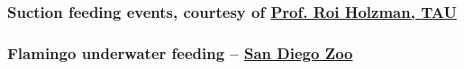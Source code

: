 \begin{frame}[label=app-22]
    \frametitle{Suction feeding events, courtesy of \href{https://www.dropbox.com/s/wcytdkxuxxvn4q0/fish_feeding.mp4?raw=1}{Prof. Roi Holzman, TAU}}
\end{frame}
    
\begin{frame}[label=app-23]
    \frametitle{Flamingo underwater feeding -- \href{https://www.dropbox.com/s/ic0l5npzon834l9/flamingo.mp4?raw=1}{San Diego Zoo}}
    \begin{center}
    \end{center}
\end{frame}
    
    
